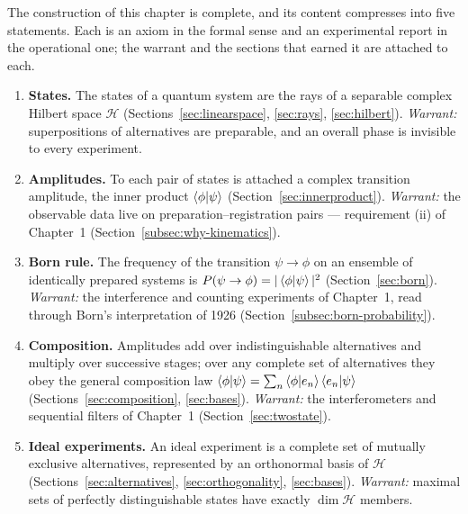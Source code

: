 The construction of this chapter is complete, and its content compresses into five statements. Each is an axiom in the formal sense and an experimental report in the operational one; the warrant and the sections that earned it are attached to each.
\begin{enumerate}
    \item[\textbf{(S1)}] \textbf{States.} The states of a quantum system are the rays of a separable complex Hilbert space $\mathcal{H}$ (Sections~\ref{sec:linearspace}, \ref{sec:rays}, \ref{sec:hilbert}). \emph{Warrant:} superpositions of alternatives are preparable, and an overall phase is invisible to every experiment.
    \item[\textbf{(S2)}] \textbf{Amplitudes.} To each pair of states is attached a complex transition amplitude, the inner product $\braket{\phi|\psi}$ (Section~\ref{sec:innerproduct}). \emph{Warrant:} the observable data live on preparation--registration pairs --- requirement (ii) of Chapter~1 (Section~\ref{subsec:why-kinematics}).
    \item[\textbf{(S3)}] \textbf{Born rule.} The frequency of the transition $\psi\to\phi$ on an ensemble of identically prepared systems is $P(\psi\to\phi)=|\braket{\phi|\psi}|^2$ (Section~\ref{sec:born}). \emph{Warrant:} the interference and counting experiments of Chapter~1, read through Born's interpretation of 1926 (Section~\ref{subsec:born-probability}).
    \item[\textbf{(S4)}] \textbf{Composition.} Amplitudes add over indistinguishable alternatives and multiply over successive stages; over any complete set of alternatives they obey the general composition law $\braket{\phi|\psi}=\sum_n\braket{\phi|e_n}\braket{e_n|\psi}$ (Sections~\ref{sec:composition}, \ref{sec:bases}). \emph{Warrant:} the interferometers and sequential filters of Chapter~1 (Section~\ref{sec:twostate}).
    \item[\textbf{(S5)}] \textbf{Ideal experiments.} An ideal experiment is a complete set of mutually exclusive alternatives, represented by an orthonormal basis of $\mathcal{H}$ (Sections~\ref{sec:alternatives}, \ref{sec:orthogonality}, \ref{sec:bases}). \emph{Warrant:} maximal sets of perfectly distinguishable states have exactly $\dim\mathcal{H}$ members.
\end{enumerate}

